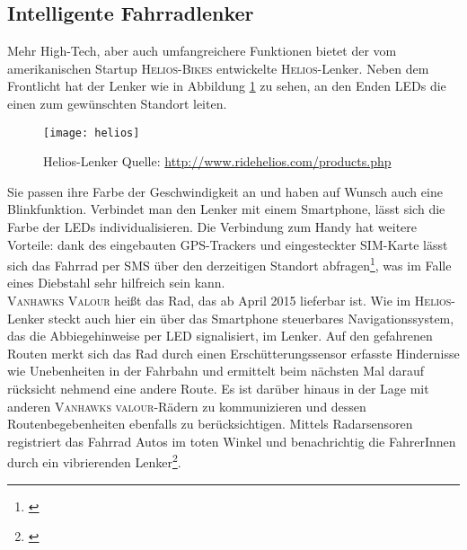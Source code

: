 \subsection{Intelligente Fahrradlenker}
Mehr High-Tech, aber auch umfangreichere Funktionen bietet der vom amerikanischen Startup \textsc{Helios-Bikes} entwickelte \textsc{Helios}-Lenker. Neben dem Frontlicht hat der Lenker wie in Abbildung \ref{fig:helios} zu sehen, an den Enden \gls{LED}s die einen zum gewünschten Standort leiten. 
\begin{figure}[H]
    \centering
    \texttt{[image: helios]}
    \caption[Helios-Lenker]{Helios-Lenker  Quelle: \url{http://www.ridehelios.com/products.php}} \label{fig:helios}
\end{figure}
Sie passen ihre Farbe der Geschwindigkeit an und haben auf Wunsch auch eine Blinkfunktion. Verbindet man den Lenker mit einem Smartphone, lässt sich die Farbe der \gls{LED}s individualisieren. Die Verbindung zum Handy hat weitere Vorteile: dank des eingebauten \gls{GPS}-Trackers und eingesteckter SIM-Karte lässt sich das Fahrrad per SMS über den derzeitigen Standort abfragen\footnote{\cite{Helios}}, was im Falle eines Diebstahl sehr hilfreich sein kann.\\
\textsc{Vanhawks Valour} heißt das Rad, das ab April 2015 lieferbar ist. Wie im \textsc{Helios}-Lenker steckt auch hier ein über das Smartphone steuerbares Navigationssystem, das die Abbiegehinweise per \gls{LED} signalisiert, im Lenker. Auf den gefahrenen Routen merkt sich das Rad durch einen Erschütterungssensor erfasste Hindernisse wie Unebenheiten in der Fahrbahn und ermittelt beim nächsten Mal darauf rücksicht nehmend eine andere Route. Es ist darüber hinaus in der Lage mit anderen \textsc{Vanhawks valour}-Rädern zu kommunizieren und dessen Routenbegebenheiten ebenfalls zu berücksichtigen. Mittels Radarsensoren registriert das Fahrrad Autos im toten Winkel und benachrichtig die FahrerInnen durch ein vibrierenden Lenker\footnote{\cite{vanhawks}}.
